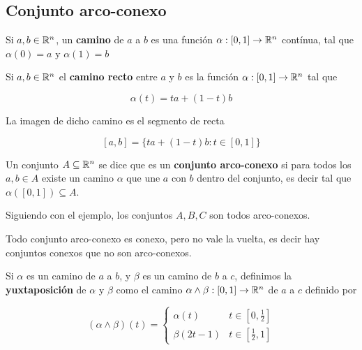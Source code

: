 \subsection{Conjunto arco-conexo}

\begin{definition}[Camino]
Si $a,b \in \mathbb{R}^n$, un \textbf{camino} de $a$ a $b$ es una función $ \alpha : [0,1] \to \mathbb{R}^n$ contínua, tal que $\alpha(0) = a$ y $\alpha(1) = b$
\end{definition}

\begin{example}
Si $a, b \in \mathbb{R}^n$ el \textbf{camino recto} entre $a$ y $b$ es la función $\alpha : [0,1] \to \mathbb{R}^n$ tal que

$$ \alpha(t) = ta + (1-t)b $$

La imagen de dicho camino es el segmento de recta

$$ [a,b] = \{ ta + (1-t)b : t \in [0,1] \} $$
\end{example}

\begin{definition}
Un conjunto $A \subseteq \mathbb{R}^n$ se dice que es un \textbf{conjunto arco-conexo}  si para todos los $a,b \in A$ existe un camino $\alpha$ que une $a$ con $b$ dentro del conjunto, es decir tal que $\alpha([0,1]) \subseteq A$.
\end{definition}

\begin{example}
Siguiendo con el ejemplo, los conjuntos $A,B,C$ son todos arco-conexos.
\end{example}

\begin{observation}
Todo conjunto arco-conexo es conexo, pero no vale la vuelta, es decir hay conjuntos conexos que no son arco-conexos.
\end{observation}

\begin{definition}
Si $\alpha$ es un camino de $a$ a $b$, y $\beta$ es un camino de $b$ a $c$, definimos la \textbf{yuxtaposición} de $\alpha$ y $\beta$ como el camino $ \alpha \wedge \beta : [0,1] \to \mathbb{R}^n$ de $a$ a $c$ definido por 

\[
(\alpha \wedge \beta)(t) = 
\begin{cases}
\alpha(t) &  t \in [0, \frac{1}{2}] \\
\beta(2t-1) &  t \in [\frac{1}{2},1]
\end{cases}
\]
\end{definition}

